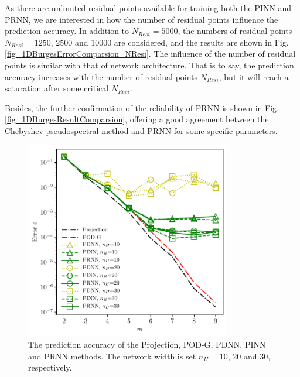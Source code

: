 \documentclass[preprint, 10pt]{elsarticle}
\begin{document}
As there are unlimited residual points available for training both the PINN and PRNN, we are interested in how the number of residual points influence the prediction accuracy. In addition to $N_{Resi}=5000$, the numbers of residual points $N_{Resi}=1250$, $2500$ and $10000$ are considered, and the results are shown in Fig. \ref{fig_1DBurgesErrorComparsion_NResi}. The influence of the number of residual points is similar with that of network architecture. That is to say, the prediction accuracy increases with the number of residual points $N_{Resi}$, but it will reach a saturation after some critical $N_{Resi}$.

Besides, the further confirmation of the reliability of PRNN is shown in Fig. \ref{fig_1DBurgesResultComparsion}, offering a good agreement between the Chebyshev pseudospectral method and PRNN for some specific parameters.

\begin{figure}[!ht]
  \centering
  \includegraphics[width=9cm]{../../pythonNN/1DBurges/fig/ErrorComparsion_Netsize.pdf}
\caption{The prediction accuracy of the Projection, POD-G, PDNN, PINN and PRNN methods. The network width is set $n_H=10$, 20 and 30, respectively.}
\label{fig_1DBurgesErrorComparsion_Netsize}
\end{figure}
\end{document}
